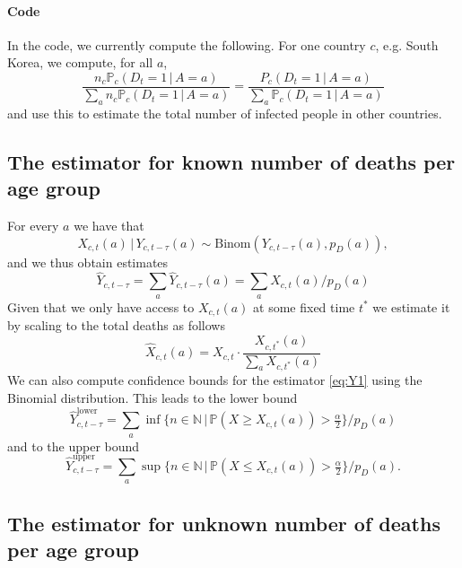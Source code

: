 \documentclass[a4paper]{article}
\newcommand\N{\mathbb{N}}
\renewcommand\P{\mathbb{P}}
\newcommand{\given}{\, \vert \,}
\begin{document}
\paragraph{Code}
In the code, we currently compute the following. 
For one country $c$, e.g. South Korea, we compute, for all $a$,
$$
\frac{n_c \P_c(D_t = 1\,|\,A = a)}
{\sum_a n_c \P_c(D_t = 1\,|\,A = a)}
=
\frac{P_c(D_t = 1\,|\,A = a)}
{\sum_a \P_c(D_t = 1\,|\,A = a)}
$$
and use this to estimate the total number 
of infected people in other countries.




\subsection{The estimator for known number of deaths per age group} \label{sec:known}
%
For every $a$ we have that 
$$X_{c,t}(a) \given Y_{c,t-\tau}(a) \sim \text{Binom}(Y_{c,t-\tau}(a), p_D(a)),$$
and we thus obtain estimates
\begin{equation}
  \label{eq:Y1}
  \hat{Y}_{c,t-\tau} = \sum_a \hat{Y}_{c,t-\tau}(a) =\sum_a
  X_{c,t}(a) / p_D(a)
\end{equation}
Given that we only have access to $X_{c,t}(a)$ at some fixed time
$t^*$ we estimate it by scaling to the total deaths as follows
\begin{equation*}
  \hat{X}_{c,t}(a)=X_{c,t}\cdot\frac{X_{c,t^*}(a)}{\sum_a X_{c,t^*}(a)}
\end{equation*}
We can also compute confidence bounds for the estimator \eqref{eq:Y1}
using the Binomial distribution. This leads to the lower bound
\begin{equation*}
  \hat{Y}_{c,t-\tau}^{\text{lower}} = \sum_a \inf\{n\in\N \,\vert\, \P(X\geq
  X_{c,t}(a))>\tfrac{\alpha}{2}\} / p_D(a)
\end{equation*}
and to the upper bound
\begin{equation*}
  \hat{Y}_{c,t-\tau}^{\text{upper}} = \sum_a \sup\{n\in\N \,\vert\, \P(X\leq
  X_{c,t}(a))>\tfrac{\alpha}{2}\} / p_D(a).
\end{equation*}

\subsection{The estimator for unknown number of deaths per age group} \label{sec:unknown}
\end{document}
